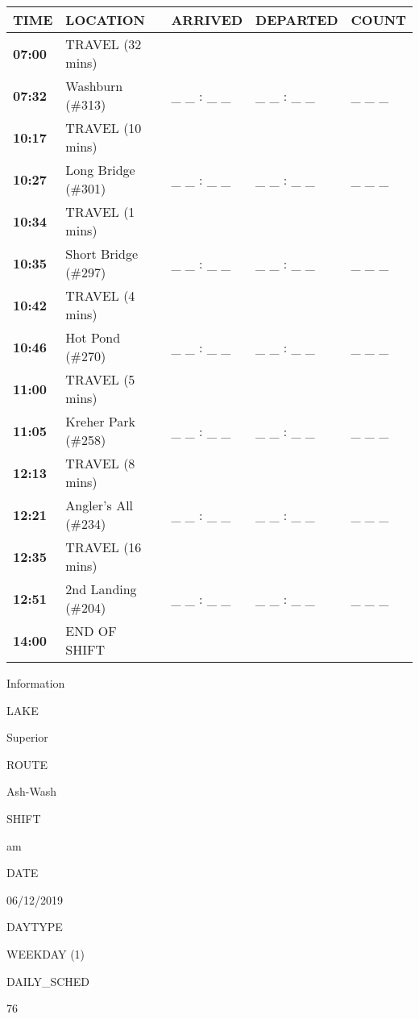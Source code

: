 \documentclass[]{article}
\begin{document}
\begin{tabular}{>{\bfseries}lllll}
\toprule
\textbf{TIME} & \textbf{LOCATION} & \textbf{ARRIVED} & \textbf{DEPARTED} & \textbf{COUNT}\\
\midrule
07:00 & TRAVEL (32 mins) &  &  & \\
07:32 & Washburn (\#313) & \_ \_ : \_ \_ & \_ \_ : \_ \_ & \_ \_ \_\\
10:17 & TRAVEL (10 mins) &  &  & \\
10:27 & Long Bridge (\#301) & \_ \_ : \_ \_ & \_ \_ : \_ \_ & \_ \_ \_\\
10:34 & TRAVEL (1 mins) &  &  & \\
10:35 & Short Bridge (\#297) & \_ \_ : \_ \_ & \_ \_ : \_ \_ & \_ \_ \_\\
10:42 & TRAVEL (4 mins) &  &  & \\
10:46 & Hot Pond (\#270) & \_ \_ : \_ \_ & \_ \_ : \_ \_ & \_ \_ \_\\
11:00 & TRAVEL (5 mins) &  &  & \\
11:05 & Kreher Park (\#258) & \_ \_ : \_ \_ & \_ \_ : \_ \_ & \_ \_ \_\\
12:13 & TRAVEL (8 mins) &  &  & \\
12:21 & Angler's All (\#234) & \_ \_ : \_ \_ & \_ \_ : \_ \_ & \_ \_ \_\\
12:35 & TRAVEL (16 mins) &  &  & \\
12:51 & 2nd Landing (\#204) & \_ \_ : \_ \_ & \_ \_ : \_ \_ & \_ \_ \_\\
14:00 & END OF SHIFT &  &  & \\
\bottomrule
\end{tabular}\newpage

Information

LAKE

Superior

ROUTE

Ash-Wash

SHIFT

am

DATE

06/12/2019

DAYTYPE

WEEKDAY (1)

DAILY\_SCHED

76

\vspace{24pt}
\end{document}
